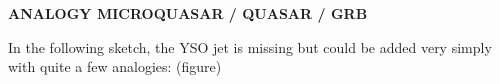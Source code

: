 \documentclass[10pt,a4paper,english]{article}
\begin{document}
\textbf{ANALOGY MICROQUASAR / QUASAR / GRB}

In the following sketch, the YSO jet is missing but could be added very simply
with quite a few analogies: (figure)

\appendix

\makeatletter
\def\@seccntformat#1{Appendix~\csname the#1\endcsname:\quad}
\makeatother

\newpage




\listoffixmes
\end{document}

